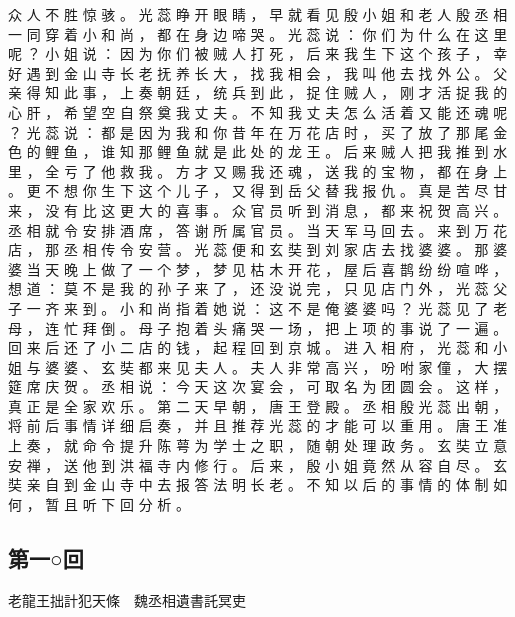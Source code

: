 {众 人 不 胜 惊 骇 。
光 蕊 睁 开 眼 睛 ， 早 就 看 见 殷 小 姐 和 老 人 殷 丞 相 一 同 穿 着 小 和 尚 ， 都 在 身 边 啼 哭 。
光 蕊 说 ： 你 们 为 什 么 在 这 里 呢 ？ 小 姐 说 ： 因 为 你 们 被 贼 人 打 死 ， 后 来 我 生 下 这 个 孩 子 ， 幸 好 遇 到 金 山 寺 长 老 抚 养 长 大 ， 找 我 相 会 ， 我 叫 他 去 找 外 公 。
父 亲 得 知 此 事 ， 上 奏 朝 廷 ， 统 兵 到 此 ， 捉 住 贼 人 ， 刚 才 活 捉 我 的 心 肝 ， 希 望 空 自 祭 奠 我 丈 夫 。
不 知 我 丈 夫 怎 么 活 着 又 能 还 魂 呢 ？ 光 蕊 说 ： 都 是 因 为 我 和 你 昔 年 在 万 花 店 时 ， 买 了 放 了 那 尾 金 色 的 鲤 鱼 ， 谁 知 那 鲤 鱼 就 是 此 处 的 龙 王 。
后 来 贼 人 把 我 推 到 水 里 ， 全 亏 了 他 救 我 。
方 才 又 赐 我 还 魂 ， 送 我 的 宝 物 ， 都 在 身 上 。
更 不 想 你 生 下 这 个 儿 子 ， 又 得 到 岳 父 替 我 报 仇 。
真 是 苦 尽 甘 来 ， 没 有 比 这 更 大 的 喜 事 。
众 官 员 听 到 消 息 ， 都 来 祝 贺 高 兴 。
丞 相 就 令 安 排 酒 席 ， 答 谢 所 属 官 员 。
当 天 军 马 回 去 。
来 到 万 花 店 ， 那 丞 相 传 令 安 营 。
光 蕊 便 和 玄 奘 到 刘 家 店 去 找 婆 婆 。
那 婆 婆 当 天 晚 上 做 了 一 个 梦 ， 梦 见 枯 木 开 花 ， 屋 后 喜 鹊 纷 纷 喧 哗 ， 想 道 ： 莫 不 是 我 的 孙 子 来 了 ， 还 没 说 完 ， 只 见 店 门 外 ， 光 蕊 父 子 一 齐 来 到 。
小 和 尚 指 着 她 说 ： 这 不 是 俺 婆 婆 吗 ？ 光 蕊 见 了 老 母 ， 连 忙 拜 倒 。
母 子 抱 着 头 痛 哭 一 场 ， 把 上 项 的 事 说 了 一 遍 。
回 来 后 还 了 小 二 店 的 钱 ， 起 程 回 到 京 城 。
进 入 相 府 ， 光 蕊 和 小 姐 与 婆 婆 、 玄 奘 都 来 见 夫 人 。
夫 人 非 常 高 兴 ， 吩 咐 家 僮 ， 大 摆 筵 席 庆 贺 。
丞 相 说 ： 今 天 这 次 宴 会 ， 可 取 名 为 团 圆 会 。
这 样 ， 真 正 是 全 家 欢 乐 。
第 二 天 早 朝 ， 唐 王 登 殿 。
丞 相 殷 光 蕊 出 朝 ， 将 前 后 事 情 详 细 启 奏 ， 并 且 推 荐 光 蕊 的 才 能 可 以 重 用 。
唐 王 准 上 奏 ， 就 命 令 提 升 陈 萼 为 学 士 之 职 ， 随 朝 处 理 政 务 。
玄 奘 立 意 安 禅 ， 送 他 到 洪 福 寺 内 修 行 。
后 来 ， 殷 小 姐 竟 然 从 容 自 尽 。
玄 奘 亲 自 到 金 山 寺 中 去 报 答 法 明 长 老 。
不 知 以 后 的 事 情 的 体 制 如 何 ， 暂 且 听 下 回 分 析 。
}\switchcolumn\flushpage  \begin{pinyinscope}{\myfontt \section{第一○回}     老龍王拙計犯天條　魏丞相遺書託冥吏

}
\end{pinyinscope}
